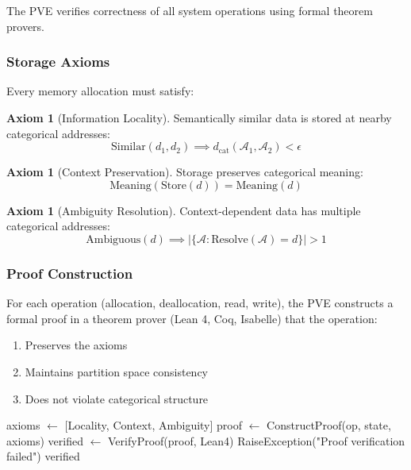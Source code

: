 \documentclass[twocolumn,10pt]{article}
\theoremstyle{definition}
\newtheorem{axiom}[theorem]{Axiom}
\theoremstyle{remark}
\newcommand{\cataddr}{\mathcal{A}}
\newcommand{\dcat}{d_{\text{cat}}}
\begin{document}
The PVE verifies correctness of all system operations using formal theorem provers.

\subsubsection{Storage Axioms}

Every memory allocation must satisfy:

\begin{axiom}[Information Locality]
Semantically similar data is stored at nearby categorical addresses:
\begin{equation}
    \text{Similar}(d_1, d_2) \implies \dcat(\cataddr_1, \cataddr_2) < \epsilon
\end{equation}
\end{axiom}

\begin{axiom}[Context Preservation]
Storage preserves categorical meaning:
\begin{equation}
    \text{Meaning}(\text{Store}(d)) = \text{Meaning}(d)
\end{equation}
\end{axiom}

\begin{axiom}[Ambiguity Resolution]
Context-dependent data has multiple categorical addresses:
\begin{equation}
    \text{Ambiguous}(d) \implies |\{\cataddr : \text{Resolve}(\cataddr) = d\}| > 1
\end{equation}
\end{axiom}

\subsubsection{Proof Construction}

For each operation (allocation, deallocation, read, write), the PVE constructs a formal proof in a theorem prover (Lean 4, Coq, Isabelle) that the operation:
\begin{enumerate}
    \item Preserves the axioms
    \item Maintains partition space consistency
    \item Does not violate categorical structure
\end{enumerate}

\begin{algorithm}
\caption{Proof Validation}
\begin{algorithmic}[1]
    \State axioms $\gets$ [Locality, Context, Ambiguity]
    \State proof $\gets$ ConstructProof(op, state, axioms)
    \State verified $\gets$ VerifyProof(proof, Lean4)
        \State RaiseException("Proof verification failed")
    \EndIf
    \State \Return verified
\EndFunction
\end{algorithmic}
\end{algorithm}
\end{document}
